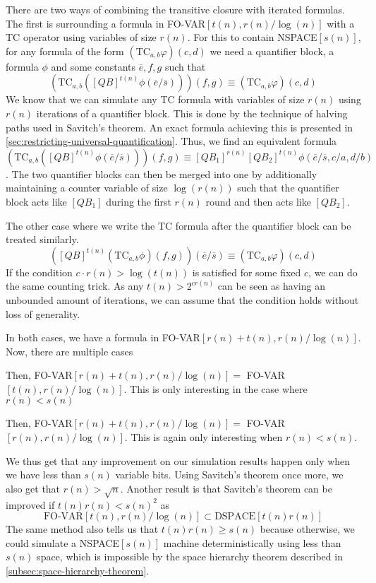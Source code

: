 There are two ways of combining the transitive closure with iterated formulas.
The first is surrounding a formula in FO-VAR$[t(n), r(n)/\log(n)]$ with a TC operator using variables of size $r(n)$.
For this to contain NSPACE$[s(n)]$, for any formula of the form $(\text{TC}_{a, b}\varphi)(c, d)$ we need a quantifier block, a formula $\phi$ and some constants $\overline{e}, f, g$ such that
\[
    \left(\text{TC}_{a, b}\left([QB]^{t(n)}\phi(\overline{e}/\overline{s})\right)\right)(f, g) \equiv (\text{TC}_{a, b}\varphi)(c, d)
\]
We know that we can simulate any TC formula with variables of size $r(n)$ using $r(n)$ iterations of a quantifier block.
This is done by the technique of halving paths used in Savitch's theorem.
An exact formula achieving this is presented in \cref{sec:restricting-universal-quantification}.
Thus, we find an equivalent formula
\[
    \left(\text{TC}_{a, b}\left([QB]^{t(n)}\phi(\overline{e}/\overline{s})\right)\right)(f, g) \equiv [QB_1]^{r(n)}[QB_2]^{t(n)}\phi(\overline{e}/\overline{s}, c/a, d/b)
\].
The two quantifier blocks can then be merged into one by additionally maintaining a counter variable of size $\log(r(n))$ such that the quantifier block acts like $[QB_1]$ during the first $r(n)$ round and then acts like $[QB_2]$.

The other case where we write the TC formula after the quantifier block can be treated similarly.
\[
    \left([QB]^{t(n)}\left(\text{TC}_{a, b}\phi\right)(f, g)\right)(\overline{e}/\overline{s}) \equiv (\text{TC}_{a, b}\varphi)(c, d)
\]
If the condition $c \cdot r(n) > \log(t(n))$ is satisfied for some fixed $c$, we can do the same counting trick.
As any $t(n) > 2^{cr(n)}$ can be seen as having an unbounded amount of iterations, we can assume that the condition holds without loss of generality.

In both cases, we have a formula in FO-VAR$[r(n) + t(n), r(n)/\log(n)]$.
Now, there are multiple cases
\begin{description}
    \setlength\itemsep{0.2em}
    \item[$r(n) \leq t(n)$]  Then, FO-VAR$[r(n) + t(n), r(n)/\log(n)] =$ FO-VAR$[t(n), r(n)/\log(n)]$.
    This is only interesting in the case where $r(n) < s(n)$
    \item[$r(n) > t(n)$] Then, FO-VAR$[r(n) + t(n), r(n)/\log(n)] =$ FO-VAR$[r(n), r(n)/\log(n)]$.
    This is again only interesting when $r(n) < s(n)$.
\end{description}

We thus get that any improvement on our simulation results happen only when we have less than $s(n)$ variable bits.
Using Savitch's theorem once more, we also get that $r(n) > \sqrt{n}$.
Another result is that Savitch's theorem can be improved if $t(n)r(n) < s(n)^2$ as
\[
    \text{FO-VAR}[t(n), r(n)/\log(n)] \subset \text{DSPACE}[t(n)r(n)]
\]
The same method also tells us that $t(n)r(n) \geq s(n)$ because otherwise, we could simulate a NSPACE$[s(n)]$ machine deterministically using less than $s(n)$ space, which is impossible by the space hierarchy theorem described in \cref{subsec:space-hierarchy-theorem}.
